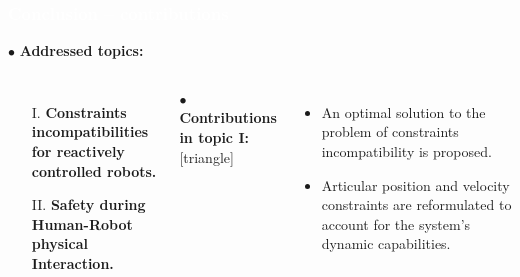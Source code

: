 \begin{frame}[noframenumbering]
\frametitle{{\textcolor{white}{\hspace{0.3cm}Conclusion -- contributions}}}


\hspace{-6mm}
$\bullet$ {\color{blue-violet}\textbf{Addressed topics:}}
\begin{columns}
\column{\paperwidth-10mm}
\begin{itemize}
\item[I.]  {\color{red}\textbf{Constraints incompatibilities for reactively controlled robots.}}
\item[II.] {\color{red}\textbf{Safety during Human-Robot physical Interaction.}}
\end{itemize}
\vspace{5mm}

$\bullet$ {\color{ao(english)}\textbf{Contributions in topic I:}}
[triangle] 
\begin{itemize}
\item An optimal solution to the problem of constraints incompatibility is proposed.


\item Articular position and velocity constraints are reformulated to account for the system's dynamic capabilities.




\end{itemize}

\end{columns}
\end{frame}



